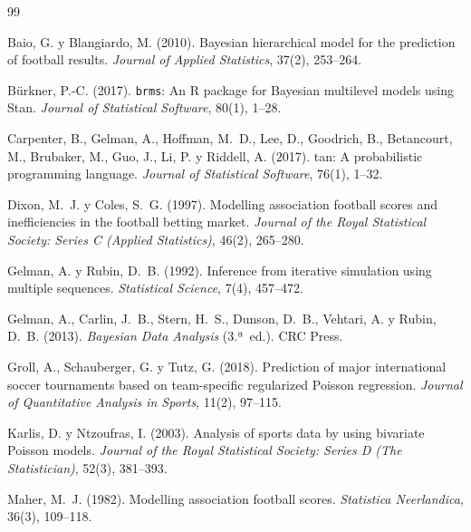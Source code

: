 \documentclass[12pt,a4paper]{article}
\begin{document}
\begin{thebibliography}{99}

Baio, G. y Blangiardo, M. (2010).
\newblock Bayesian hierarchical model for the prediction of football results.
\newblock \textit{Journal of Applied Statistics}, 37(2), 253--264.

Bürkner, P.-C. (2017).
\newblock \texttt{brms}: An {R} package for {B}ayesian multilevel models using {S}tan.
\newblock \textit{Journal of Statistical Software}, 80(1), 1--28.

Carpenter, B., Gelman, A., Hoffman, M.~D., Lee, D., Goodrich, B., Betancourt, M.,
Brubaker, M., Guo, J., Li, P. y Riddell, A. (2017).
tan: A probabilistic programming language.
\newblock \textit{Journal of Statistical Software}, 76(1), 1--32.

Dixon, M.~J. y Coles, S.~G. (1997).
\newblock Modelling association football scores and inefficiencies in the
  football betting market.
\newblock \textit{Journal of the Royal Statistical Society: Series C (Applied
  Statistics)}, 46(2), 265--280.

Gelman, A. y Rubin, D.~B. (1992).
\newblock Inference from iterative simulation using multiple sequences.
\newblock \textit{Statistical Science}, 7(4), 457--472.

Gelman, A., Carlin, J.~B., Stern, H.~S., Dunson, D.~B., Vehtari, A. y Rubin,
  D.~B. (2013).
\newblock \textit{Bayesian Data Analysis} (3.ª~ed.).
\newblock CRC Press.

Groll, A., Schauberger, G. y Tutz, G. (2018).
\newblock Prediction of major international soccer tournaments based on
  team-specific regularized {P}oisson regression.
\newblock \textit{Journal of Quantitative Analysis in Sports}, 11(2), 97--115.

Karlis, D. y Ntzoufras, I. (2003).
\newblock Analysis of sports data by using bivariate {P}oisson models.
\newblock \textit{Journal of the Royal Statistical Society: Series D (The
  Statistician)}, 52(3), 381--393.

Maher, M.~J. (1982).
\newblock Modelling association football scores.
\newblock \textit{Statistica Neerlandica}, 36(3), 109--118.


\end{thebibliography}
\end{document}

